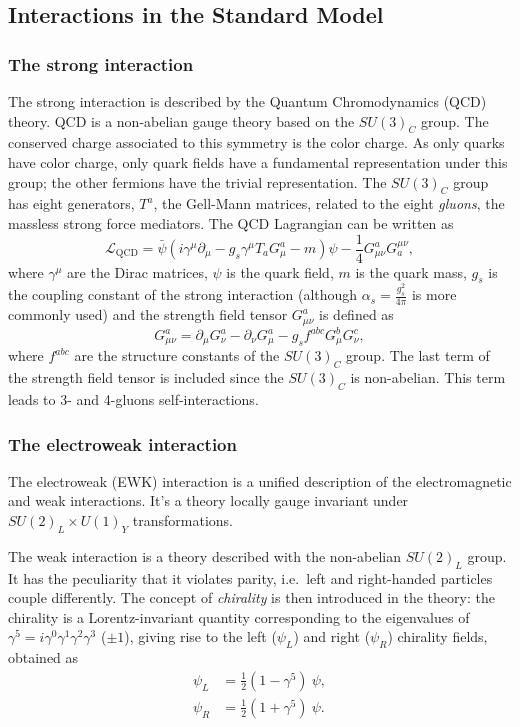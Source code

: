 \documentclass[../main.tex]{subfiles}
\begin{document}
\subsection{Interactions in the Standard Model}

\subsubsection{The strong interaction}

The strong interaction is described by the Quantum Chromodynamics (QCD) theory. QCD is a non-abelian gauge theory based on the $SU(3)_C$ group. The conserved charge associated to this symmetry is the color charge. As only quarks have color charge, only quark fields have a fundamental representation under this group; the other fermions have the trivial representation. The $SU(3)_C$ group has eight generators, $T^a$, the Gell-Mann matrices, related to the eight \textit{gluons}, the massless strong force mediators. The QCD Lagrangian can be written as
\begin{equation}
\mathcal{L}_{\text{QCD}} = \bar{\psi}\left(i\gamma^\mu\partial_\mu - g_s\gamma^\mu T_a G^a_\mu - m\right)\psi - \frac{1}{4}G_{\mu\nu}^a G_a^{\mu\nu},
\end{equation}
where $\gamma^\mu$ are the Dirac matrices,  $\psi$ is the quark field, $m$ is the quark mass, $g_s$ is the coupling constant of the strong interaction (although $\alpha_s = \frac{g_s^2}{4\pi}$ is more commonly used) and the strength field tensor $G_{\mu\nu}^a$ is defined as 
\begin{equation}
G_{\mu\nu}^a = \partial_\mu G_\nu^a - \partial_\nu G_\mu^a - g_s f^{abc} G_\mu^b G_\nu^c,
\end{equation}
where $f^{abc}$ are the structure constants of the $SU(3)_C$ group. The last term of the strength field tensor is included since the $SU(3)_C$ is non-abelian. This term leads to 3- and 4-gluons self-interactions.

\subsubsection{The electroweak interaction}

The electroweak (EWK) interaction is a unified description of the electromagnetic and weak interactions. It's a theory locally gauge invariant under $SU(2)_L \times U(1)_Y$ transformations.

The weak interaction is a theory described with the non-abelian $SU(2)_L$ group. It has the peculiarity that it violates parity, i.e.~left and right-handed particles couple differently. The concept of \textit{chirality} is then introduced in the theory: the chirality is a Lorentz-invariant quantity corresponding to the eigenvalues of $\gamma^5=i\gamma^0\gamma^1\gamma^2\gamma^3$ ($\pm1$), giving rise to the left ($\psi_L$) and right ($\psi_R$) chirality fields, obtained as
\begin{align}
\label{theo:eq:chiral_1}
\psi_L &= \frac{1}{2}(1 - \gamma^5)~\psi, \\
\label{theo:eq:chiral_2}
\psi_R &= \frac{1}{2}(1 + \gamma^5)~\psi.
\end{align}
\end{document}
